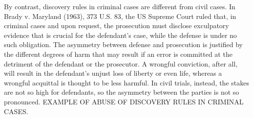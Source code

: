 \documentclass[10pt]{article}
\begin{document}



 
By contrast, discovery rules in criminal cases are different from civil cases. 
In Brady v. Maryland (1963), 373 U.S. 83, the US Supreme Court ruled that, in criminal cases and upon request, the prosecution must 
disclose exculpatory evidence that is crucial for the defendant's case, while the defense is under no such obligation.
The asymmetry between defense and prosecution is justified by the different degrees of harm that may result if an error is committed at the detriment of the defendant or the prosecutor. A wrongful conviction, after all, will result  
in the defendant's unjust loss of liberty or even life, whereas a wrongful acquittal 
is thought to be less harmful. In civil trials, instead, the stakes are not so high for defendants, 
so the asymmetry between the parties is not so pronounced.
EXAMPLE OF ABUSE OF DISCOVERY RULES IN CRIMINAL CASES.

%
%
\end{document}
